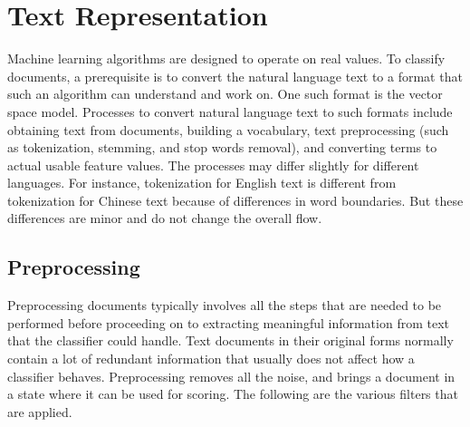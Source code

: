 \chapter{Text Representation}
\label{chapter:Text Representation}

Machine learning algorithms are designed to operate on real values. To classify documents, a prerequisite is to convert the natural language text to a format that such an algorithm can understand and work on. One such format is the vector space model. Processes to convert natural language text to such formats include obtaining text from documents, building a vocabulary, text preprocessing (such as tokenization, stemming, and stop words removal), and converting terms to actual usable feature values. The processes may differ slightly for different languages. For instance, tokenization for English text is different from tokenization for Chinese text because of differences in word boundaries. But these differences are minor and do not change the overall flow.

\section{Preprocessing}
Preprocessing documents typically involves all the steps that are needed to be performed before proceeding on to extracting meaningful information from text that the classifier could handle. Text documents in their original forms normally contain a lot of redundant information that usually does not affect how a classifier behaves. Preprocessing removes all the noise, and brings a document in a state where it can be used for scoring. The following are the various filters that are applied.

